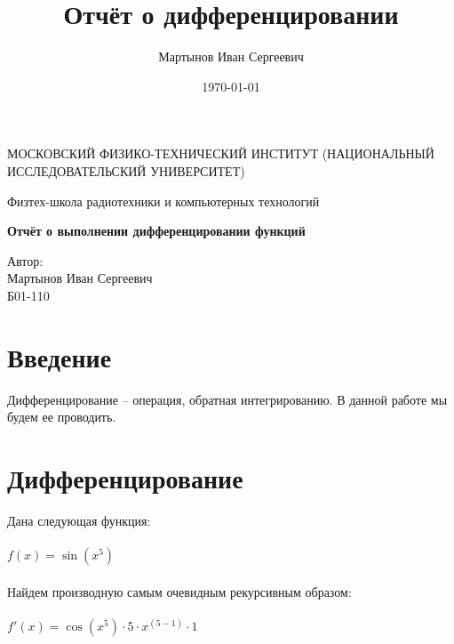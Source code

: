 \documentclass[a4paper,12pt]{article} %
\author{Мартынов Иван Сергеевич}
\title{ Отчёт о дифференцировании
}
\date{\today}
\begin{document}
\begin{titlepage}
\begin{center}
{\large МОСКОВСКИЙ ФИЗИКО-ТЕХНИЧЕСКИЙ ИНСТИТУТ (НАЦИОНАЛЬНЫЙ ИССЛЕДОВАТЕЛЬСКИЙ УНИВЕРСИТЕТ)}
\end{center}
\begin{center}
{\large Физтех-школа радиотехники и компьютерных технологий}
\end{center}


\vspace{4.5cm}
{\huge
\begin{center}
{\bf Отчёт о выполнении дифференцировании функций}
\end{center}
}
\vspace{2cm}
\begin{center}
{\LARGE Автор:\\ Мартынов Иван Сергеевич \\
\vspace{0.2cm}
Б01-110}
\end{center}
\end{titlepage}


\section{Введение}

Дифференцирование -- операция, обратная интегрированию. В данной работе мы будем ее проводить.

\section{Дифференцирование}

Дана следующая функция:\\ 
 \hspace{1cm}\\ 
 

$ f(x) =  \sin\left({x} ^ {{5}} \right) $\\ 
 \hspace{1cm}\\ 
 

Найдем производную самым очевидным рекурсивным образом:\\ 
 \hspace{1cm}\\ 
 

$ f'(x) =  \cos\left({x} ^ {{5}} \right) \cdot {5} \cdot {x} ^ { {\left( {5} - {1} \right)} } \cdot {1} $\\ 
 \hspace{1cm}\\ 
 
\end{document}
